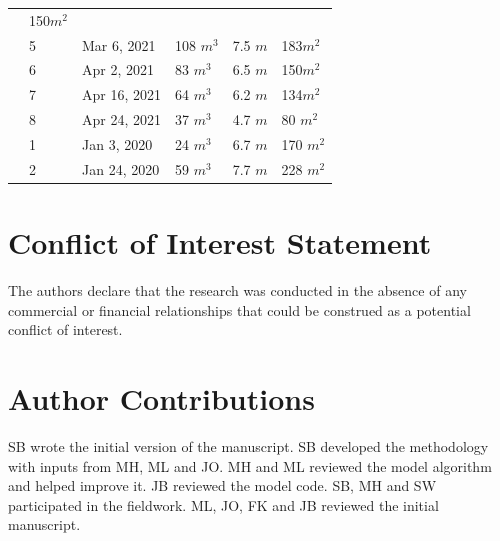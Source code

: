 \documentclass[utf8]{frontiersSCNS} %
\begin{document}
\begin{table}
\begin{tabular}{@{}|llllll|@{}}
		                       & 150$m^{2}$                                                                       \\
		\multicolumn{1}{|l|}{} & 5            & Mar 6, 2021   & 108 $m^{3}$     & 7.5 $m$
		                       & 183$m^{2}$                                                                       \\
		\multicolumn{1}{|l|}{} & 6            & Apr 2, 2021   & 83 $m^{3}$      & 6.5 $m$
		                       & 150$m^{2}$                                                                       \\
		\multicolumn{1}{|l|}{} & 7            & Apr 16, 2021  & 64 $m^{3}$      & 6.2 $m$
		                       & 134$m^{2}$                                                                       \\
		\multicolumn{1}{|l|}{} & 8            & Apr 24, 2021  & 37 $m^{3}$      & 4.7 $m$
		                       & 80 $m^{2}$                                                                       \\
		\midrule
		\multicolumn{1}{|l|}{\multirow{2}{*}{\rotatebox[origin=c]{90}{CH20}}}
		                       & 1            & Jan 3, 2020   & 24 $m^{3}$      & 6.7 $m$
		                       & 170 $m^{2}$                                                                      \\
		\multicolumn{1}{|l|}{} & 2            & Jan 24, 2020  & 59 $m^{3}$      & 7.7 $m$
		                       & 228 $m^{2}$                                                                      \\
		\midrule
	\end{tabular}

\end{table}

\section*{Conflict of Interest Statement} The authors declare that the research was conducted in the absence of any
commercial or financial relationships that could be construed as a potential conflict of interest.

\section*{Author Contributions} SB wrote the initial version of the manuscript. SB developed the methodology with
inputs from MH, ML and JO. MH and ML reviewed the model algorithm and helped improve it. JB reviewed the model
code.  SB, MH and SW participated in the fieldwork. ML, JO, FK and JB reviewed the initial manuscript.
\end{document}
